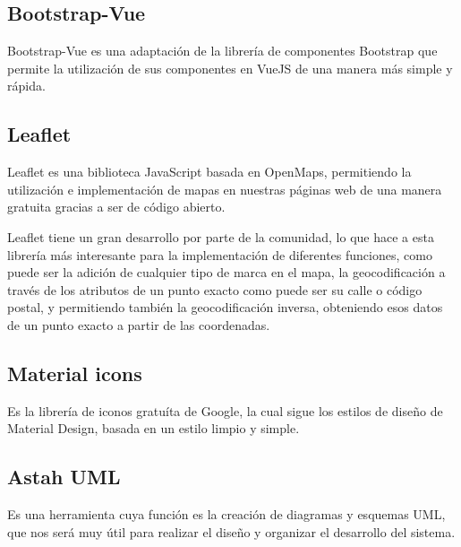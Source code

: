     \subsection{Bootstrap-Vue}

Bootstrap-Vue es una adaptación de la librería de componentes Bootstrap que permite la utilización de sus componentes en VueJS de una manera más simple y rápida.~\cite{bootstrap-vue}

    \subsection{Leaflet}

Leaflet es una biblioteca JavaScript basada en OpenMaps, permitiendo la utilización e implementación de mapas en nuestras páginas web de una manera gratuita gracias a ser de código abierto.~\cite{leaflet}

Leaflet tiene un gran desarrollo por parte de la comunidad, lo que hace a esta librería más interesante para la implementación de diferentes funciones, como puede ser la adición de cualquier tipo de marca en el mapa, la geocodificación a través de los atributos de un punto exacto como puede ser su calle o código postal, y permitiendo también la geocodificación inversa, obteniendo esos datos de un punto exacto a partir de las coordenadas.

    \subsection{Material icons}

Es la librería de iconos gratuíta de Google, la cual sigue los estilos de diseño de Material Design, basada en un estilo limpio y simple.

    \subsection{Astah UML}
Es una herramienta cuya función es la creación de diagramas y esquemas UML, que nos será muy útil para realizar el diseño y organizar el desarrollo del sistema.
